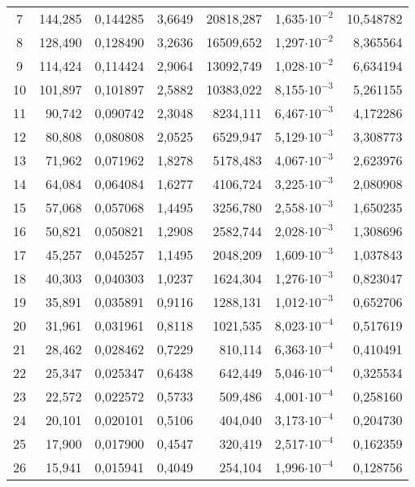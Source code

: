 \begin{longtable}{crrrrrr}
 7 &    144,285 &   0,144285 &     3,6649 &  20818,287 &  1,635$\cdot 10^{-2}$ &  10,548782 \\
 8 &    128,490 &   0,128490 &     3,2636 &  16509,652 &  1,297$\cdot 10^{-2}$ &   8,365564 \\
 9 &    114,424 &   0,114424 &     2,9064 &  13092,749 &  1,028$\cdot 10^{-2}$ &   6,634194 \\
10 &    101,897 &   0,101897 &     2,5882 &  10383,022 &  8,155$\cdot 10^{-3}$ &   5,261155 \\
11 &     90,742 &   0,090742 &     2,3048 &   8234,111 &  6,467$\cdot 10^{-3}$ &   4,172286 \\
12 &     80,808 &   0,080808 &     2,0525 &   6529,947 &  5,129$\cdot 10^{-3}$ &   3,308773 \\
13 &     71,962 &   0,071962 &     1,8278 &   5178,483 &  4,067$\cdot 10^{-3}$ &   2,623976 \\
14 &     64,084 &   0,064084 &     1,6277 &   4106,724 &  3,225$\cdot 10^{-3}$ &   2,080908 \\
15 &     57,068 &   0,057068 &     1,4495 &   3256,780 &  2,558$\cdot 10^{-3}$ &   1,650235 \\
16 &     50,821 &   0,050821 &     1,2908 &   2582,744 &  2,028$\cdot 10^{-3}$ &   1,308696 \\
17 &     45,257 &   0,045257 &     1,1495 &   2048,209 &  1,609$\cdot 10^{-3}$ &   1,037843 \\
18 &     40,303 &   0,040303 &     1,0237 &   1624,304 &  1,276$\cdot 10^{-3}$ &   0,823047 \\
19 &     35,891 &   0,035891 &     0,9116 &   1288,131 &  1,012$\cdot 10^{-3}$ &   0,652706 \\
20 &     31,961 &   0,031961 &     0,8118 &   1021,535 &  8,023$\cdot 10^{-4}$ &   0,517619 \\
21 &     28,462 &   0,028462 &     0,7229 &    810,114 &  6,363$\cdot 10^{-4}$ &   0,410491 \\
22 &     25,347 &   0,025347 &     0,6438 &    642,449 &  5,046$\cdot 10^{-4}$ &   0,325534 \\
23 &     22,572 &   0,022572 &     0,5733 &    509,486 &  4,001$\cdot 10^{-4}$ &   0,258160 \\
24 &     20,101 &   0,020101 &     0,5106 &    404,040 &  3,173$\cdot 10^{-4}$ &   0,204730 \\
25 &     17,900 &   0,017900 &     0,4547 &    320,419 &  2,517$\cdot 10^{-4}$ &   0,162359 \\
26 &     15,941 &   0,015941 &     0,4049 &    254,104 &  1,996$\cdot 10^{-4}$ &   0,128756 \\

\end{longtable}
